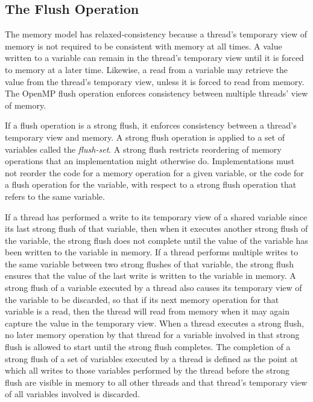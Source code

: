 \subsection{The Flush Operation}
\label{subsec:The Flush Operation}


The memory model has relaxed-consistency because a thread's temporary view of
memory is not required to be consistent with memory at all times. A value
written to a variable can remain in the thread's temporary view until it is
forced to memory at a later time. Likewise, a read from a variable may
retrieve the value from the thread's temporary view, unless it is forced to
read from memory. The OpenMP flush operation enforces consistency between
multiple threads' view of memory.

If a flush operation is a strong flush, it enforces consistency between a
thread's temporary view and memory.  A strong flush operation is applied to a
set of variables called the \emph{flush-set}. A strong flush restricts
reordering of memory operations that an implementation might otherwise do.
Implementations must not reorder the code for a memory operation for a given
variable, or the code for a flush operation for the variable, with respect to
a strong flush operation that refers to the same variable.

If a thread has performed a write to its temporary view of a shared variable
since its last strong flush of that variable, then when it executes another
strong flush of the variable, the strong flush does not complete until the
value of the variable has been written to the variable in memory. If a thread
performs multiple writes to the same variable between two strong flushes of
that variable, the strong flush ensures that the value of the last write is
written to the variable in memory. A strong flush of a variable executed by a
thread also causes its temporary view of the variable to be discarded, so that
if its next memory operation for that variable is a read, then the thread will
read from memory when it may again capture the value in the temporary view.
When a thread executes a strong flush, no later memory operation by that
thread for a variable involved in that strong flush is allowed to start until
the strong flush completes.  The completion of a strong flush of a set of
variables executed by a thread is defined as the point at which all writes to
those variables performed by the thread before the strong flush are visible in
memory to all other threads and that thread’s temporary view of all variables
involved is discarded.

